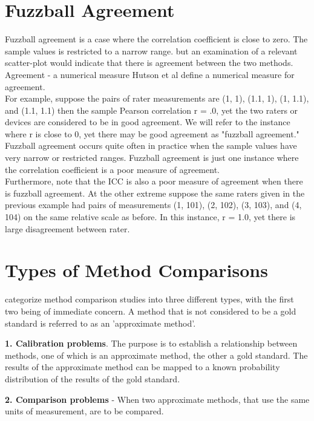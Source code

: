 \documentclass[12pt, a4paper]{article}
\begin{document}
\section{Fuzzball Agreement}
Fuzzball agreement is a case where the correlation coefficient is close to zero. The sample values is restricted to a narrow range. but an examination of a relevant scatter-plot would indicate that
there is agreement between the two methods.
\\
Agreement - a numerical measure Hutson et al define a numerical measure for agreement.
\\
For example, suppose the pairs of rater measurements are (1, 1), (1.1, 1), (1, 1.1), and (1.1, 1.1) then the sample Pearson correlation r = .0, yet the two raters or devices are considered to be in good agreement. We will refer to the instance where r is close to 0, yet there may be good agreement as "fuzzball agreement." \\Fuzzball agreement occurs quite often in practice when the sample values have very narrow or restricted ranges. Fuzzball agreement is just one instance where the correlation coefficient is a poor measure of agreement. \\Furthermore, note that the ICC is also a poor measure of agreement when there is fuzzball agreement. At the other extreme suppose the same raters given in the previous example had pairs of measurements (1, 101), (2, 102), (3, 103), and (4, 104) on the same relative scale as before. In this instance, r = 1.0, yet there is large disagreement between rater.

\section{Types of Method Comparisons} \citet{Lewis} categorize
method comparison studies into three different types, with the
first two being of immediate concern. A method that is not considered to be a gold standard is referred
to as an 'approximate method'.

\textbf{1. Calibration problems}. The purpose is to establish a
relationship between methods, one of which is an approximate
method, the other a gold standard. The results of the approximate
method can be mapped to a known probability distribution of the
results of the gold standard.

\smallskip
\textbf{2. Comparison problems} - When two approximate methods,
that use the same units of measurement, are to be compared.
\end{document}
